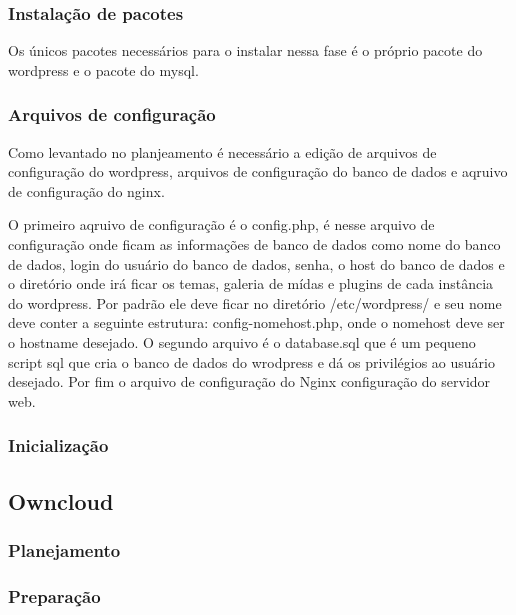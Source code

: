 \subsubsection{Instalação de pacotes}

Os únicos pacotes necessários para o instalar nessa fase é o próprio pacote do
wordpress e o pacote do mysql.


\subsubsection{Arquivos de configuração}

Como levantado no planjeamento é necessário a edição de arquivos de configuração
do wordpress, arquivos de configuração do banco de dados e aqruivo de configuração
do nginx.

O primeiro aqruivo de configuração é o config.php, é nesse arquivo de
configuração onde ficam as informações de banco de dados como nome do banco de dados,
login do usuário do banco de dados, senha, o host do banco de dados e o diretório
onde irá ficar os temas, galeria de mídas e plugins de cada instância do wordpress.
Por padrão ele deve ficar no diretório /etc/wordpress/ e seu nome deve conter
a seguinte estrutura: config-nomehost.php, onde o nomehost deve ser o hostname
desejado. O segundo arquivo é o database.sql que é um pequeno script sql que
cria o banco de dados do wrodpress e dá os privilégios ao usuário desejado. Por fim
o arquivo de configuração do Nginx configuração do servidor web.


\subsubsection{Inicialização}


\subsection{Owncloud}
\label{sub:owncloud}

\subsubsection{Planejamento}
\subsubsection{Preparação}
